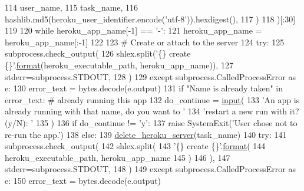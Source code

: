 \begin{DoxyCode}
114             user\_name,
115             task\_name,
116             hashlib.md5(heroku\_user\_identifier.encode(\textcolor{stringliteral}{'utf-8'})).hexdigest(),
117         )
118     )[:30]
119 
120     \textcolor{keywordflow}{while} heroku\_app\_name[-1] == \textcolor{stringliteral}{'-'}:
121         heroku\_app\_name = heroku\_app\_name[:-1]
122 
123     \textcolor{comment}{# Create or attach to the server}
124     \textcolor{keywordflow}{try}:
125         subprocess.check\_output(
126             shlex.split(\textcolor{stringliteral}{'\{\} create \{\}'}.\hyperlink{namespaceparlai_1_1chat__service_1_1services_1_1messenger_1_1shared__utils_a32e2e2022b824fbaf80c747160b52a76}{format}(heroku\_executable\_path, heroku\_app\_name)),
127             stderr=subprocess.STDOUT,
128         )
129     \textcolor{keywordflow}{except} subprocess.CalledProcessError \textcolor{keyword}{as} e:
130         error\_text = bytes.decode(e.output)
131         \textcolor{keywordflow}{if} \textcolor{stringliteral}{"Name is already taken"} \textcolor{keywordflow}{in} error\_text:  \textcolor{comment}{# already running this app}
132             do\_continue = \hyperlink{namespaceparlai_1_1mturk_1_1core_1_1dev_1_1test_1_1test__full__system_a1e1817cd65688fb90f827834d1fb4567}{input}(
133                 \textcolor{stringliteral}{'An app is already running with that name, do you want to '}
134                 \textcolor{stringliteral}{'restart a new run with it? (y/N): '}
135             )
136             \textcolor{keywordflow}{if} do\_continue != \textcolor{stringliteral}{'y'}:
137                 \textcolor{keywordflow}{raise} SystemExit(\textcolor{stringliteral}{'User chose not to re-run the app.'})
138             \textcolor{keywordflow}{else}:
139                 \hyperlink{namespaceparlai_1_1mturk_1_1core_1_1server__utils_a8dfde882f9d6ff492ca565ae2334fc70}{delete\_heroku\_server}(task\_name)
140                 \textcolor{keywordflow}{try}:
141                     subprocess.check\_output(
142                         shlex.split(
143                             \textcolor{stringliteral}{'\{\} create \{\}'}.\hyperlink{namespaceparlai_1_1chat__service_1_1services_1_1messenger_1_1shared__utils_a32e2e2022b824fbaf80c747160b52a76}{format}(
144                                 heroku\_executable\_path, heroku\_app\_name
145                             )
146                         ),
147                         stderr=subprocess.STDOUT,
148                     )
149                 \textcolor{keywordflow}{except} subprocess.CalledProcessError \textcolor{keyword}{as} e:
150                     error\_text = bytes.decode(e.output)

\end{DoxyCode}
